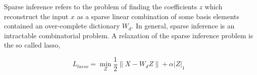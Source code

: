 
Sparse inference refers to the problem of finding the coefficients $z$ which
reconstruct the input $x$ as a sparse linear combination of some basis elements
contained an over-complete dictionary $W_d$. In general, sparse inference is an 
intractable combinatorial problem. A relaxation of the sparse inference problem is
the so called lasso, 

\begin{equation}
L_{lasso} = \min_Z \frac{1}{2}\|X-W_dZ\| + \alpha |Z|_1 
\end{equation} 

